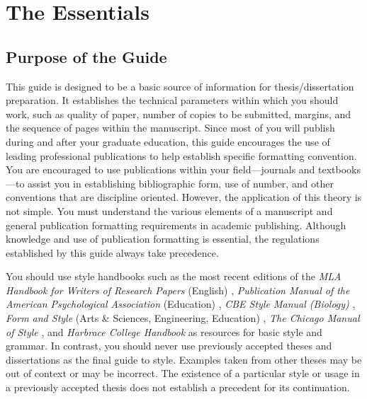 \chapter{The Essentials}
\label{chap:TheEssentials}

\section{Purpose of the Guide}
\label{sec:PurposeOfTheGuide}

This guide is designed to be a basic source of information for
the\-sis/dis\-ser\-ta\-tion preparation. It establishes the technical
parameters within which you should work, such as quality of paper,
number of copies to be submitted, margins, and the sequence of pages
within the manuscript. Since most of you will publish during and after
your graduate education, this guide encourages the use of leading
professional publications to help establish specific formatting
convention. You are encouraged to use publications within your
field---journals and textbooks---to assist you in establishing
bibliographic form, use of number, and other conventions that are
discipline oriented.  However, the application of this theory is not
simple. You must understand the various elements of a manuscript and
general publication formatting requirements in academic publishing.
Although knowledge and use of publication formatting is essential, the
regulations established by this guide always take precedence.

You should use style handbooks such as the most recent editions of the
\textit{MLA Handbook for Writers of Research Papers} (English)
\cite{gibaldi1988}, \textit{Publication Manual of the American
  Psychological Association} (Education) \cite{apa1983}, \textit{CBE
  Style Manual (Biology)} \cite{cbe1983}, \textit{Form and Style}
(Arts \& Sciences, Engineering, Education) \cite{campbell1990},
\textit{The Chicago Manual of Style} \cite{chicago1982}, and
\textit{Harbrace College Handbook} \cite{hodges1990} as resources for
basic style and grammar. In contrast, you should never use previously
accepted theses and dissertations as the final guide to style.
Examples taken from other theses may be out of context or may be
incorrect. The existence of a particular style or usage in a
previously accepted thesis does not establish a precedent for its
continuation.

